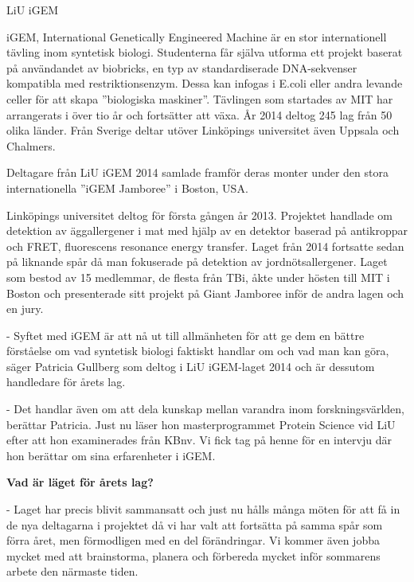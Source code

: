 \begin{news}{3}{LiU iGEM}{}{}{}{}

  iGEM, International Genetically Engineered Machine är en stor
  internationell tävling inom syntetisk biologi. Studenterna får
  själva utforma ett projekt baserat på användandet av biobricks, en
  typ av standardiserade DNA-sekvenser kompatibla med
  restriktionsenzym. Dessa kan infogas i E.coli eller andra levande
  celler för att skapa ”biologiska maskiner”. Tävlingen som startades
  av MIT har arrangerats i över tio år och fortsätter att växa. År
  2014 deltog 245 lag från 50 olika länder. Från Sverige deltar utöver
  Linköpings universitet även Uppsala och Chalmers.

     {Deltagare från LiU iGEM 2014 samlade
     framför deras monter under den stora internationella ”iGEM
     Jamboree” i Boston, USA.}

  Linköpings universitet deltog för första gången år 2013. Projektet
  handlade om detektion av äggallergener i mat med hjälp av en
  detektor baserad på antikroppar och FRET, fluorescens resonance
  energy transfer. Laget från 2014 fortsatte sedan på liknande spår då
  man fokuserade på detektion av jordnötsallergener. Laget som bestod
  av 15 medlemmar, de flesta från TBi, åkte under hösten till MIT i Boston 
  och presenterade sitt projekt på Giant Jamboree inför de andra lagen och en 
  jury.

  - Syftet med iGEM är att nå ut till allmänheten för att ge dem en
  bättre förståelse om vad syntetisk biologi faktiskt handlar om och
  vad man kan göra, säger Patricia Gullberg som deltog i LiU
  iGEM-laget 2014 och är dessutom handledare för årets lag.

  - Det handlar även om att dela kunskap mellan varandra inom
  forskningsvärlden, berättar Patricia. Just nu läser hon
  masterprogrammet Protein Science vid LiU efter att hon examinerades
  från KBnv. Vi fick tag på henne för en intervju där hon berättar om
  sina erfarenheter i iGEM.


  \textbf{Vad är läget för årets lag?}  
  
  - Laget har precis blivit
  sammansatt och just nu hålls många möten för att få in de nya
  deltagarna i projektet då vi har valt att fortsätta på samma spår
  som förra året, men förmodligen med en del förändringar. Vi kommer
  även jobba mycket med att brainstorma, planera och förbereda mycket
  inför sommarens arbete den närmaste tiden.


\end{news}
